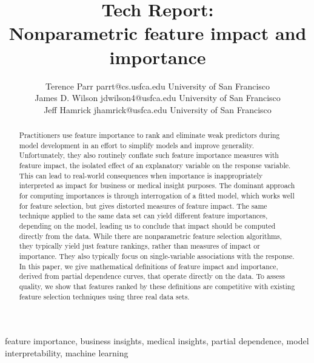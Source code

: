 \documentclass[11pt]{article}
\begin{document}
\def\spacingset#1{\renewcommand{\baselinestretch}%
{#1}\small\normalsize} \spacingset{1}



\title{\bf Tech Report:\\
Nonparametric feature impact and importance}

\author{Terence Parr \email parrt@cs.usfca.edu
\addr University of San Francisco\\
\AND James D. Wilson \email jdwilson4@usfca.edu
\addr University of San Francisco\\
\AND Jeff Hamrick \email jhamrick@usfca.edu
      \addr University of San Francisco}

\maketitle

\begin{abstract}%
Practitioners use feature importance to rank and eliminate weak predictors during model development in an effort to simplify models and improve generality.  Unfortunately, they also routinely conflate such feature importance measures with feature impact, the isolated effect of an explanatory variable on the response variable.   This can lead to real-world consequences when importance is inappropriately interpreted as impact for business or medical insight purposes. The dominant approach for computing importances is through interrogation of a fitted model, which works well for feature selection, but gives distorted measures of feature impact. The same technique applied to the same data set can yield different feature importances, depending on the model, leading us to conclude that impact should be computed directly from the data.  While there are nonparametric feature selection algorithms, they typically yield just feature rankings, rather than measures of impact or importance. They also typically focus on single-variable associations with the response. In this paper, we give mathematical definitions of feature impact and importance, derived from partial dependence curves, that operate directly on the data. To assess quality, we show that features ranked by these definitions are competitive with existing feature selection techniques using three real data sets.
\end{abstract}

\begin{keywords}
feature importance, business insights, medical insights, partial dependence, model interpretability, machine learning
\end{keywords}
\end{document}
